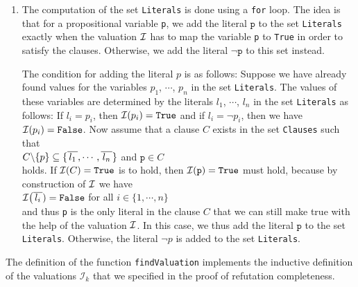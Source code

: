 \begin{enumerate}
\begin{enumerate}
      \end{enumerate}
\item The computation of the set \texttt{Literals} is done using a \texttt{for} loop.
      The idea is that for a propositional variable \texttt{p}, we add the literal
      $\texttt{p}$ to the set \texttt{Literals} exactly when the valuation $\mathcal{I}$ has to map the variable \texttt{p}
      to \texttt{True} in order to satisfy the clauses. Otherwise, we add
      the literal $\neg\texttt{p}$ to this set instead.

      The condition for adding the literal $p$ is as follows:
      Suppose we have already found values for the variables
      $p_1$, $\cdots$, $p_n$ in the set \texttt{Literals}.
      The values of these variables are determined by the literals $l_1$, $\cdots$, $l_n$ in the set \texttt{Literals}
      as follows: If $l_i = p_i$, then $\mathcal{I}(p_i) = \texttt{True}$
      and if $l_i = \neg p_i$, then we have $\mathcal{I}(p_i) = \texttt{False}$.
      Now assume that a clause $C$ exists in the set \texttt{Clauses} such that
      \\[0.2cm]
      \hspace*{1.3cm}
      $C \backslash \{p\} \subseteq \{ \overline{\,l_1\,}, \cdots, \overline{\,l_n\,} \}$ \quad and \quad $\texttt{p} \in C$
      \\[0.2cm]
      holds. If $\mathcal{I}(C) = \texttt{True}$ is to hold, then $\mathcal{I}(\texttt{p}) = \texttt{True}$ must hold, because
      by construction of $\mathcal{I}$ we have
      \\[0.2cm]
      \hspace*{1.3cm}
      $\mathcal{I}\bigl(\overline{\,l_i\,}) = \texttt{False}$ \quad for all $i \in \{1,\cdots,n\}$
      \\[0.2cm]
      and thus \texttt{p} is the only literal in the clause $C$ that we can still make true with the help of the valuation $\mathcal{I}$. In this case, we thus add the literal
      $\texttt{p}$ to the set \texttt{Literals}. Otherwise, the literal $\neg p$ is added to the set
      \texttt{Literals}.
\end{enumerate}
The definition of the function \texttt{findValuation} implements the inductive definition of the valuations
$\mathcal{I}_k$ that we specified in the proof of refutation completeness.


